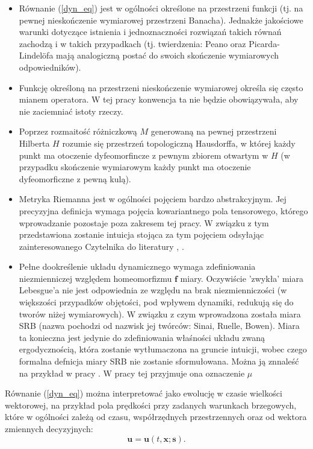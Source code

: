 \documentclass[12pt]{article}
\begin{document}
\begin{itemize}
	\item Równanie (\ref{dyn_eq}) jest w ogólności określone na przestrzeni funkcji (tj. na pewnej nieskończenie wymiarowej przestrzeni Banacha). Jednakże jakościowe warunki dotyczące istnienia i jednoznaczności rozwiązań takich równań zachodzą i w takich przypadkach (tj. twierdzenia: Peano oraz Picarda-Lindelöfa mają analogiczną postać do swoich skończenie wymiarowych odpowiedników).
	\item Funkcję określoną na przestrzeni nieskończenie wymiarowej określa się często mianem operatora. W tej pracy konwencja ta nie będzie obowiązywała, aby nie zaciemniać istoty rzeczy.
	\item Poprzez rozmaitość różniczkową $ M $ generowaną na pewnej przestrzeni Hilberta $ H $ rozumie się przestrzeń topologiczną Hausdorffa, w której każdy punkt ma otoczenie dyfeomorfincze z pewnym zbiorem otwartym w $ H$ (w przypadku skończenie wymiarowym każdy punkt ma otoczenie dyfeomorficzne z pewną kulą).
	\item Metryka Riemanna jest w ogólności pojęciem bardzo abstrakcyjnym. Jej precyzyjna definicja wymaga pojęcia kowariantnego pola tensorowego, którego wprowadzanie pozostaje poza zakresem tej pracy. W związku z tym przedstawiona zostanie intuicja stojąca za tym pojęciem odsyłając zainteresowanego Czytelnika do literatury \cite{Blackmore}, \cite{Maurin2}.
	\item Pełne dookreślenie układu dynamicznego wymaga zdefiniowania niezmienniczej względem homeomorfizmu $ \textbf{f} $ miary. Oczywiście 'zwykła' miara Lebesgue'a nie jest odpowiednia ze względu na brak niezmienniczości (w większości przypadków objętości, pod wpływem dynamiki, redukują się do tworów niżej wymiarowych). W związku z czym wprowadzona została miara SRB (nazwa pochodzi od nazwisk jej twórców: Sinai, Ruelle, Bowen). Miara ta konieczna jest jedynie do zdefiniowania właśności układu zwaną ergodycznością, która zostanie wytłumaczona na gruncie intuicji, wobec czego formalna defnicja miary SRB nie zostanie sformułowana. Można ją znnaleść na przykład w pracy \cite{Ruelle1}. W pracy tej przyjmuje ona oznaczenie $\mu$
\end{itemize}
Równanie (\ref{dyn_eq}) można interpretować jako ewolucję w czasie wielkości wektorowej, na przykład pola prędkości przy zadanych warunkach brzegowych, które w ogólności zależą od czasu, współrzędnych przestrzennych oraz od wektora zmiennych decyzyjnych:
\begin{equation}
\textbf{u} = \textbf{u}(t,
\textbf{x};\textbf{s}).
\label{utxs}
\end{equation}
\end{document}
